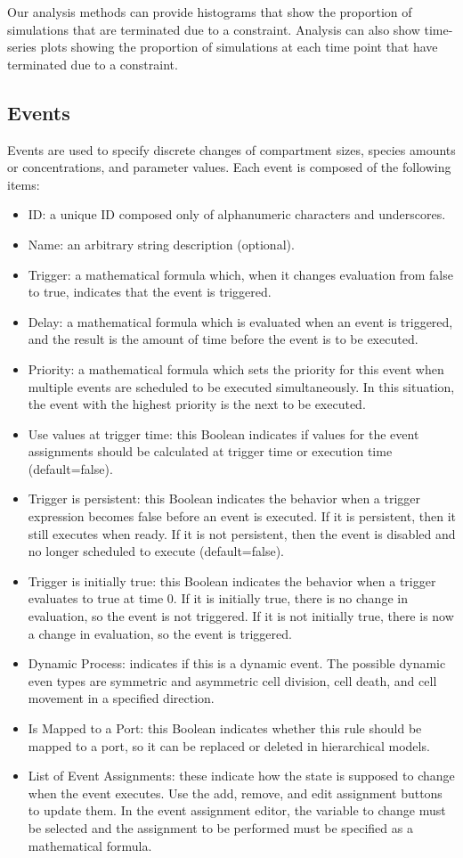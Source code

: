 \documentclass[titlepage,11pt]{article}
\begin{document}
Our analysis methods can provide histograms that show the proportion of simulations that are terminated due to a constraint.  Analysis can also show time-series plots showing the proportion of simulations at each time point that have terminated due to a constraint. 

\subsection{\label{Events}Events}

\noindent
Events are used to specify discrete changes of compartment sizes, species amounts or concentrations, and parameter values.  Each event is composed of the following items:
\begin{itemize}
\item ID: a unique ID composed only of alphanumeric characters and underscores.
\item Name: an arbitrary string description (optional).
\item Trigger: a mathematical formula which, when it changes evaluation from false to true, indicates that the event is triggered.
\item Delay: a mathematical formula which is evaluated when an event is triggered, and the result is the amount of time before the event is to be executed.
\item Priority: a mathematical formula which sets the priority for this event when multiple events are scheduled to be executed simultaneously.  In this situation, the event with the highest priority is the next to be executed.
\item Use values at trigger time: this Boolean indicates if values for the event assignments should be calculated at trigger time or execution time (default=false).
\item Trigger is persistent: this Boolean indicates the behavior when a trigger expression becomes false before an event is executed.  If it is persistent, then it still executes when ready.  If it is not persistent, then the event is disabled and no longer scheduled to execute (default=false).
\item Trigger is initially true: this Boolean indicates the behavior when a trigger evaluates to true at time 0.  If it is initially true, there is no change in evaluation, so the event is not triggered.  If it is not initially true, there is now a change in evaluation, so the event is triggered.
\item Dynamic Process: indicates if this is a dynamic event.  The possible dynamic even types are symmetric and asymmetric cell division, cell death, and cell movement in a specified direction.
\item Is Mapped to a Port: this Boolean indicates whether this rule should be mapped to a port, so it can be replaced or deleted in hierarchical models.
\item List of Event Assignments: these indicate how the state is supposed to change when the event executes.  Use the add, remove, and edit assignment buttons to update them.  In the event assignment editor, the variable to change must be selected and the assignment to be performed must be specified as a mathematical formula.
\end{itemize}
\end{document}
